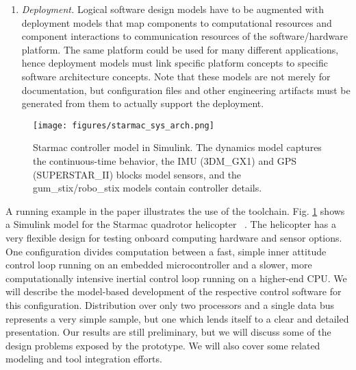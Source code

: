 \begin{enumerate}
    \item \emph{Deployment.}
Logical software design models have to be augmented with deployment models that map components to computational resources and component interactions to communication resources of the software/hardware platform. The same platform could be used for many different applications, hence deployment models must link specific platform concepts to specific software architecture concepts. Note that these models are not merely for documentation, but configuration files and other engineering artifacts must be generated from them to actually support the deployment.
\end{enumerate}    

\begin{figure}[ht]
\centering
\texttt{[image: figures/starmac\_sys\_arch.png]}
    \caption{Starmac controller model in Simulink. The dynamics model captures the continuous-time behavior, the IMU (3DM\_GX1) and GPS (SUPERSTAR\_II) blocks model sensors, and the gum\_stix/robo\_stix models contain controller details.}
    \label{fig:starmac}
\end{figure}

A running example in the paper illustrates the use of the toolchain. Fig. \ref{fig:starmac} shows a Simulink model for the Starmac quadrotor helicopter ~\cite{HHWT07}.  The helicopter has a very flexible design for testing onboard computing hardware and sensor options.  One configuration divides computation between a fast, simple inner attitude control loop running on an embedded microcontroller and a slower, more computationally intensive inertial control loop running on a higher-end CPU.  We will describe the model-based development of the respective control software for this configuration.  Distribution over only two processors and a single data bus represents a very simple sample, but one which lends itself to a clear and detailed presentation.  Our results are still preliminary, but we will discuss some of the design problems exposed by the prototype.  We will also cover some related modeling and tool integration efforts.
